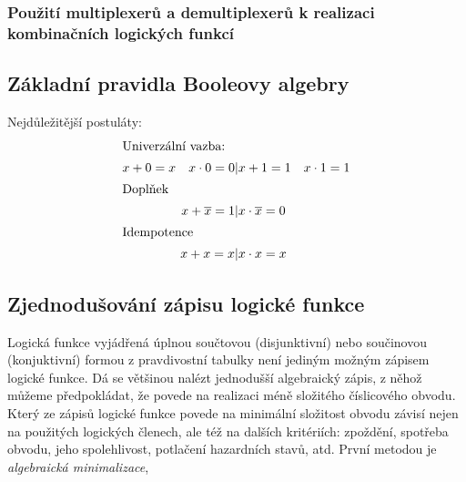       \subsubsection{Použití multiplexerů a demultiplexerů k realizaci kombinačních logických funkcí}
   
  \subsection{Základní pravidla Booleovy algebry}\label{CES:basic_bool_alg}
    Nejdůležitější postuláty:
    \begin{align}
       \shortintertext{Univerzální vazba:}
         x + 0 = x \quad x\cdot 0 = 0 &\lvert  x + 1 = 1 \quad x\cdot 1 = 1                       \\
       \shortintertext{Doplňek}
         x + \overline{x} = 1         &\lvert  x\cdot\overline{x} = 0                             \\
       \shortintertext{Idempotence}
         x +x = x                     &\lvert  x\cdot x = x      
      \label{CES:postul_Idemp}
    \end{align}
  \subsection{Zjednodušování zápisu logické funkce}
     Logická funkce vyjádřená úplnou součtovou (disjunktivní) nebo součinovou (konjuktivní) formou 
     z pravdivostní tabulky není jediným možným zápisem logické funkce. Dá se většinou nalézt 
     jednodušší algebraický zápis, z něhož můžeme předpokládat, že povede na realizaci méně 
     složitého číslicového obvodu. Který ze zápisů logické funkce povede na minimální složitost 
     obvodu závisí nejen na použitých logických členech, ale též na dalších kritériích: zpoždění, 
     spotřeba obvodu, jeho spolehlivost, potlačení hazardních stavů, atd. První metodou je 
     \emph{algebraická minimalizace}, 
     
